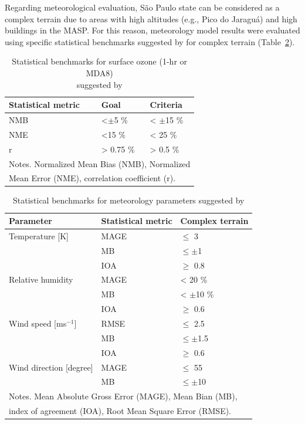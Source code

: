   Regarding meteorological evaluation, São Paulo state can be considered as a complex terrain due to areas with high altitudes (e.g., Pico do Jaraguá) and high buildings in the MASP.
  For this reason, meteorology model results were evaluated using specific statistical benchmarks suggested by \citet{Monk2019} for complex terrain (Table~\ref{tab:met_bench}).
  
  \begin{table}
	\centering
	\caption{Statistical benchmarks for surface ozone (1-hr or MDA8) \\ suggested by \citet{Emery2017}}
	\label{tab:ozone_bench}
	\begin{tabular}{lll}
  		\toprule
  		Statistical metric & Goal & Criteria \\
  		\midrule
  		NMB 	& <$\pm$5 \% 	& < $\pm$15 \% \\
  		NME    	& <15 \%		& < 25 \% \\
  		r		& > 0.75 \% 		& > 0.5 \% \\
  		\bottomrule
  		\multicolumn{3}{l}{\footnotesize Notes. Normalized Mean Bias (NMB), Normalized}\\
  		\multicolumn{3}{l}{\footnotesize Mean Error (NME), correlation coefficient (r).}
	\end{tabular}
 \end{table}
  
  \begin{table}
	\centering
	\caption{Statistical benchmarks for meteorology parameters suggested by \citet{Monk2019}}
	\label{tab:met_bench}
	\begin{tabular}{lll}
	\toprule
  	Parameter & Statistical metric & Complex terrain \\
 	 \midrule
  	Temperature [K]			& MAGE &  $\leq$ 3 \\
  		  					& MB   &  $\leq \pm$1\\
  	      					& IOA  &  $\geq$ 0.8 \\ 
  	Relative humidity   		& MAGE & < 20 \% \\
  							& MB   & < $\pm$10 \%\\
  							& IOA  &  $\geq$ 0.6\\
  	Wind speed [ms$^{-1}$]	& RMSE & $\leq$ 2.5\\
  							& MB   & $\leq \pm$1.5 \\
  							& IOA  & $\geq$ 0.6\\
  	Wind direction [degree] & MAGE & $\leq$ 55	\\
  							& MB   & $\leq \pm$10  \\
  	\bottomrule
  	\multicolumn{3}{l}{\footnotesize Notes. Mean Absolute Gross Error (MAGE), Mean Bian (MB), }\\
  	\multicolumn{3}{l}{\footnotesize index of agreement (IOA), Root Mean Square Error (RMSE).}
  	\end{tabular}
\end{table}

